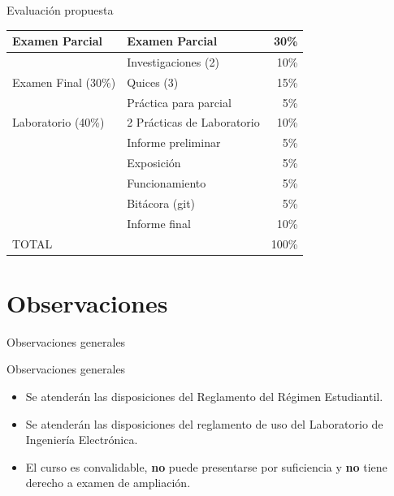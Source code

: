 \documentclass[xcolor=dvipsnames]{beamer}
\newcommand{\pageframe}[1]{\frame{\begin{center}{ \Huge #1 }\end{center}}}
\begin{document}
\begin{frame}{Evaluación propuesta}
\begin{center}
\begin{tabular}{|l|l|r|}\hline
	Examen Parcial		& Examen Parcial	& 	30\%\\\hline
				& Investigaciones (2)	&	10\%\\\cline{2-3}
	Examen Final (30\%)			& Quices (3)		&	15\%\\\cline{2-3}
				& Práctica para parcial &	 5\%\\\hline
	Laboratorio (40\%)	& 2 Prácticas de Laboratorio	&	 10\%\\\cline{2-3}
				& Informe preliminar	&	 5\%\\\cline{2-3}
				& Exposición	&	5\%\\\cline{2-3}
				& Funcionamiento	&	5\%\\\cline{2-3}
				& Bitácora (git)	&	 5\%\\\cline{2-3}
				& Informe final		&	10\%\\\hline\hline
	\multicolumn{2}{|l|}{TOTAL}			&	100\%\\\hline
\end{tabular}
\end{center}
\end{frame}
\section{Observaciones}

\pageframe{Observaciones}

\begin{frame}{Observaciones generales}
  \begin{block}{Observaciones generales}
    \begin{itemize}[<+->]
      \item Se atenderán las disposiciones del Reglamento del Régimen Estudiantil.
      \item Se atenderán las disposiciones del reglamento de uso del Laboratorio de Ingeniería Electrónica.
      \item El curso es convalidable, \textbf{no} puede presentarse por suficiencia y \textbf{no} tiene derecho a examen de ampliación.
    \end{itemize}
  \end{block}
\end{frame}
\end{document}
